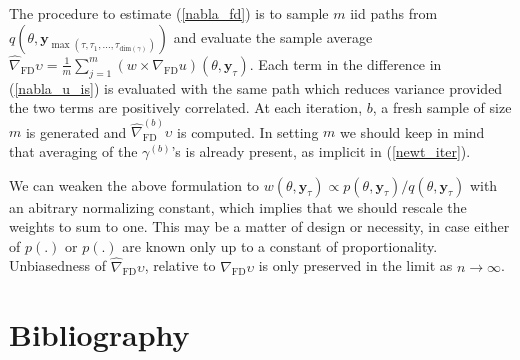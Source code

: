 \documentclass[11pt]{article}
\begin{document}
The procedure to estimate (\ref{nabla_fd}) is to sample $m$ iid paths from $q(\theta,\mathbf{y}_{\max(\tau,\tau_1,...,\tau_{\mathrm{dim}(\gamma)})})$ and evaluate the sample average $\widehat\nabla_{\mathrm{FD}}\upsilon=\frac{1}{m}\sum_{j=1}^m (w\times\nabla_{\mathrm{FD}}u)(\theta,\mathbf{y}_{\tau})$.
Each term in the difference in (\ref{nabla_u_is}) is evaluated with the same path which reduces variance provided the two terms are positively correlated. At each iteration, $b$, a fresh sample of size $m$ is generated and $\hat \nabla_{\mathrm{FD}}^{(b)}\upsilon$ is computed. In setting $m$ we should keep in mind that averaging of the $\gamma^{(b)}$'s is already present, as implicit in (\ref{newt_iter}). 

We can weaken the above formulation to $w(\theta,\mathbf{y}_{\tau}) \propto p(\theta,\mathbf{y}_\tau) / q(\theta,\mathbf{y}_\tau)$ with an abitrary normalizing constant, which implies that we should rescale the weights to sum to one.
This may be a matter of design\cite{hesterb1995} or necessity, in case either of $p(.)$ or $p(.)$ are known only up to a constant of proportionality.
Unbiasedness of $\hat \nabla_{\mathrm{FD}}\upsilon$, relative to $\nabla_{\mathrm{FD}}\upsilon$ is only preserved in the limit as $n\rightarrow \infty$.

\section*{Bibliography}
\printbibliography[heading=none]
\end{document}
